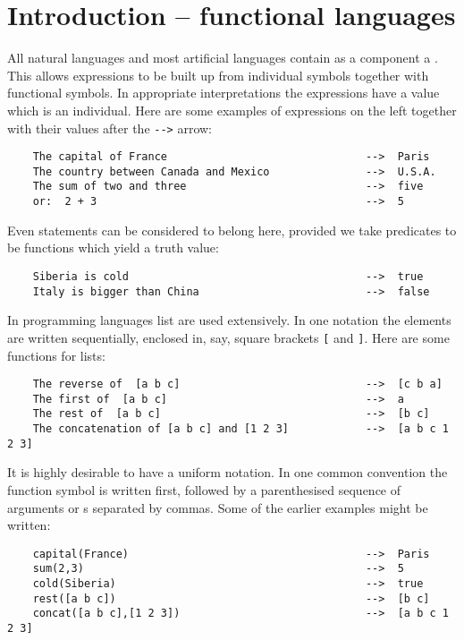 \section{Introduction -- functional languages}
\par
All natural languages and most artificial languages contain as a component
a .
This allows expressions to be built up from individual symbols
together with functional symbols.
In appropriate interpretations the expressions have a value which is
an individual.
Here are some examples of expressions on the left
together with their values after the \verb#--># arrow:
\begin{verbatim}
    The capital of France                               -->  Paris
    The country between Canada and Mexico               -->  U.S.A.
    The sum of two and three                            -->  five
    or:  2 + 3                                          -->  5
\end{verbatim}
\par
Even statements can be considered to belong here,
provided we take predicates to be functions which yield a truth value:
\begin{verbatim}
    Siberia is cold                                     -->  true
    Italy is bigger than China                          -->  false
\end{verbatim}
\par
In programming languages list are used extensively.
In one notation the elements are written sequentially,
enclosed in, say, square brackets \verb#[# and \verb#]#.
Here are some functions for lists:
\begin{verbatim}
    The reverse of  [a b c]                             -->  [c b a]
    The first of  [a b c]                               -->  a
    The rest of  [a b c]                                -->  [b c]
    The concatenation of [a b c] and [1 2 3]            -->  [a b c 1 2 3]
\end{verbatim}
\par
It is highly desirable to have a uniform notation.
In one common convention the function symbol is written first,
followed by a parenthesised sequence of arguments or s
separated by commas.
Some of the earlier examples might be written:
\begin{verbatim}
    capital(France)                                     -->  Paris
    sum(2,3)                                            -->  5
    cold(Siberia)                                       -->  true
    rest([a b c])                                       -->  [b c]
    concat([a b c],[1 2 3])                             -->  [a b c 1 2 3]
\end{verbatim}
